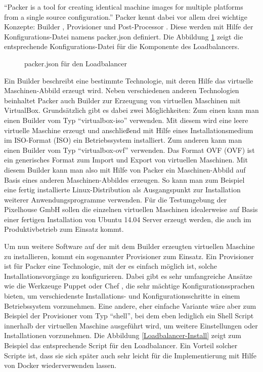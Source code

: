 "`Packer is a tool for creating identical machine images for multiple platforms from a single source configuration."' \citep[S.][]{Packer15} Packer kennt dabei vor allem drei wichtige Konzepte: Builder \citep[Vgl.][]{Packer:001}, Provisioner \citep[Vgl.][]{Packer:002} und Post-Processor \citep[Vgl.][]{Packer:003}. Diese werden mit Hilfe der Konfigurations-Datei namens packer.json definiert. Die Abbildung \ref{Loadbalancer-Packer} zeigt die entsprechende Konfigurations-Datei für die Komponente des Loadbalancers.

\begin{figure}[!ht]
  \begin{center}
    \caption{packer.json für den Loadbalancer}
    \label{Loadbalancer-Packer}
  \end{center}
\end{figure}

Ein Builder \citep[Vgl.][]{Packer:001} beschreibt eine bestimmte Technologie, mit deren Hilfe das virtuelle Maschinen-Abbild erzeugt wird. Neben verschiedenen anderen Technologien beinhaltet Packer auch Builder zur Erzeugung von virtuellen Maschinen mit VirtualBox. Grundsätzlich gibt es dabei zwei Möglichkeiten: Zum einen kann man einen Builder vom Typ "`virtualbox-iso"' verwenden. Mit diesem wird eine leere virtuelle Maschine erzeugt und anschließend mit Hilfe eines Installationsmedium im ISO-Format (\acl{ISO}) ein Betriebssystem installiert. Zum anderen kann man einen Builder vom Typ "`virtualbox-ovf"' verwenden. Das Format OVF (\acl{OVF}) ist ein generisches Format zum Import und Export von virtuellen Maschinen. Mit diesem Builder kann man also mit Hilfe von Packer ein Maschinen-Abbild auf Basis eines anderen Maschinen-Abbildes erzeugen. So kann man zum Beispiel eine fertig installierte Linux-Distribution als Ausgangspunkt zur Installation weiterer Anwendungsprogramme verwenden. Für die Testumgebung der Pixelhouse GmbH sollen die einzelnen virtuellen Maschinen idealerweise auf Basis einer fertigen Installation von Ubuntu 14.04 Server erzeugt werden, die auch im Produktivbetrieb zum Einsatz kommt.

Um nun weitere Software auf der mit dem Builder erzeugten virtuellen Maschine zu installieren, kommt ein sogenannter Provisioner \citep[Vgl.][]{Packer:002} zum Einsatz. Ein Provisioner ist für Packer eine Technologie, mit der es einfach möglich ist, solche Installationsvorgänge zu konfigurieren. Dabei gibt es sehr umfangreiche Ansätze wie die Werkzeuge Puppet \citep[][]{puppet} oder Chef \citep[][]{chef}, die sehr mächtige Konfigurationssprachen bieten, um verschiedenste Installations- und Konfigurationsschritte in einem Betriebssystem vorzunehmen. Eine andere, eher einfache Variante wäre aber zum Beispiel der Provisioner vom Typ "`shell"', bei dem eben lediglich ein Shell Script innerhalb der virtuellen Maschine ausgeführt wird, um weitere Einstellungen oder Installationen vorzunehmen. Die Abbildung \ref{Loadbalancer-Install} zeigt zum Beispiel das entsprechende Script für den Loadbalancer. Ein Vorteil solcher Scripte ist, dass sie sich später auch sehr leicht für die Implementierung mit Hilfe von Docker wiederverwenden lassen.

